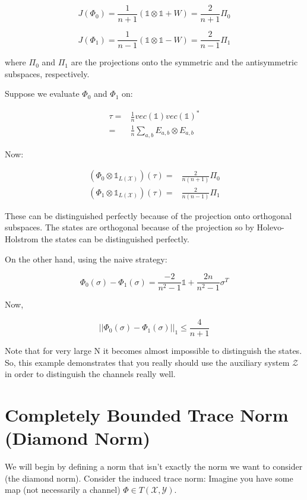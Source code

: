 \documentclass{article}
\begin{document}
\[ 
    J(\Phi_0) = \frac{1}{n+1} \left( \mathds{1}\otimes \mathds{1} + W \right) =
    \frac{2}{n+1}\Pi_0
\]

\[ 
    J(\Phi_1) = \frac{1}{n-1} \left( \mathds{1}\otimes \mathds{1} - W \right) =
    \frac{2}{n-1}\Pi_1
\]

where $\Pi_0$ and $\Pi_1$ are the projections onto the symmetric and the
antisymmetric subspaces, respectively.

Suppose we evaluate $ \Phi_0 $ and $ \Phi_1 $ on:

\begin{align*}
    \tau =& \frac{1}{n} vec(\mathds{1}) vec(\mathds{1})^*  \\
    =& \frac{1}{n} \sum_{a,b} E_{a,b} \otimes E_{a,b}
\end{align*}

Now:

\begin{align*}
    \left( \Phi_0 \otimes \mathds{1}_{L(\mathcal{X})}\right)(\tau) =& \frac{2}{n(n+1)}
\Pi_0   \\
\left( \Phi_1 \otimes \mathds{1}_{L(\mathcal{X})}\right)(\tau) =&
\frac{2}{n(n-1)} \Pi_1
\end{align*}

These can be distinguished perfectly because of the projection onto orthogonal
subspaces. The states are orthogonal because of the projection so by
Holevo-Holstrom the states can be distinguished perfectly.

On the other hand, using the naive strategy:

\[ 
    \Phi_0(\sigma) - \Phi_1(\sigma) = \frac{-2}{n^2-1} \mathds{1} +
    \frac{2n}{n^2-1} \sigma^T
\]

Now, 

\[ 
    \left| \left| \Phi_0(\sigma) - \Phi_1(\sigma) \right| \right|_1 \le
    \frac{4}{n+1} 
\]

Note that for very large N it becomes almost impossible to distinguish the
states.  So, this example demonstrates that you really should use the auxiliary
system $\mathcal{Z}$ in order to distinguish the channels really well.

\section*{Completely Bounded Trace Norm (Diamond Norm)}

We will begin by defining a norm that isn't exactly the norm we want to consider
(the diamond norm). Consider the induced trace norm: Imagine you have some map
(not necessarily a channel) $\Phi \in T(\mathcal{X},\mathcal{Y})$.
\end{document}
